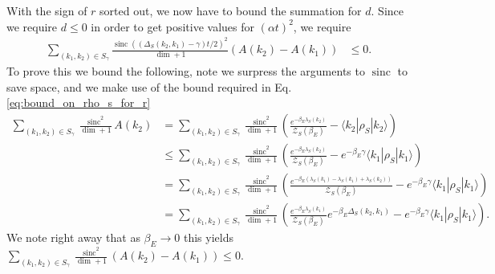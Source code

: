 \documentclass{article}
\newcommand{\ket}[1]{|#1\rangle}
\newcommand{\bra}[1]{\langle #1|}
\newcommand{\parens}[1]{\left( #1 \right)}
\newcommand{\partfun}{\mathcal{Z}}
\DeclareMathOperator{\sinc}{sinc}
\begin{document}
    With the sign of $r$ sorted out, we now have to bound the summation for $d$. Since we require $d \leq 0$ in order to get positive values for $(\alpha t)^2 $, we require
    \begin{align}
        \sum_{(k_1, k_2) \in S_{\gamma}} \frac{\sinc((\Delta_S(k_2, k_1) - \gamma)t/2)^2}{\dim + 1} (A(k_2) - A(k_1)) &\leq 0.
    \end{align}
    To prove this we bound the following, note we surpress the arguments to $\sinc$ to save space, and we make use of the bound required in Eq. \eqref{eq:bound_on_rho_s_for_r}
    \begin{align}
        \sum_{(k_1, k_2) \in S_{\gamma}} \frac{\sinc^2}{\dim + 1} A(k_2) &= \sum_{(k_1, k_2) \in S_{\gamma}} \frac{\sinc^2}{\dim + 1} \parens{\frac{e^{-\beta_E \lambda_S(k_2)}}{\partfun_S(\beta_E)}  - \bra{k_2} \rho_S \ket{k_2}} \\
        &\leq \sum_{(k_1, k_2) \in S_{\gamma}} \frac{\sinc^2}{\dim + 1} \parens{\frac{e^{-\beta_E \lambda_S(k_2)}}{\partfun_S(\beta_E)}  - e^{-\beta_E \gamma} \bra{k_1} \rho_S \ket{k_1}} \\
        &= \sum_{(k_1, k_2) \in S_{\gamma}} \frac{\sinc^2}{\dim + 1} \parens{\frac{e^{-\beta_E (\lambda_S(k_1) - \lambda_S(k_1) + \lambda_S(k_2) )}}{\partfun_S(\beta_E)}  - e^{-\beta_E \gamma} \bra{k_1} \rho_S \ket{k_1}} \\
        &= \sum_{(k_1, k_2) \in S_{\gamma}} \frac{\sinc^2}{\dim + 1} \parens{\frac{e^{-\beta_E \lambda_S(k_1)}}{\partfun_S(\beta_E)} e^{-\beta_E \Delta_S(k_2, k_1)}  - e^{-\beta_E \gamma} \bra{k_1} \rho_S \ket{k_1}}.
    \end{align}
    We note right away that as $\beta_E \to 0$ this yields $\sum_{(k_1, k_2) \in S_{\gamma}} \frac{\sinc^2}{\dim + 1} (A(k_2) - A(k_1)) \leq 0$. 
    
\end{document}
